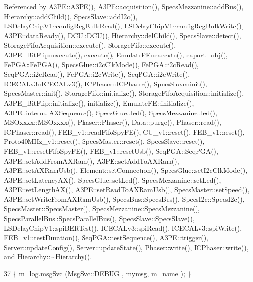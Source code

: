 Referenced by A3\+P\+E\+::\+A3\+P\+E(), A3\+P\+E\+::acquisition(), Specs\+Mezzanine\+::add\+Bus(), Hierarchy\+::add\+Child(), Specs\+Slave\+::add\+I2c(), L\+S\+Delay\+Chip\+V1\+::config\+Reg\+Bulk\+Read(), L\+S\+Delay\+Chip\+V1\+::config\+Reg\+Bulk\+Write(), A3\+P\+E\+::data\+Ready(), D\+C\+U\+::\+D\+C\+U(), Hierarchy\+::del\+Child(), Specs\+Slave\+::detect(), Storage\+Fifo\+Acquisition\+::execute(), Storage\+Fifo\+::execute(), A3\+P\+E\+\_\+\+Bit\+Flip\+::execute(), execute(), Emulate\+F\+E\+::execute(), export\+\_\+obj(), Fe\+P\+G\+A\+::\+Fe\+P\+G\+A(), Specs\+Glue\+::i2c\+Clk\+Mode(), Fe\+P\+G\+A\+::i2c\+Read(), Seq\+P\+G\+A\+::i2c\+Read(), Fe\+P\+G\+A\+::i2c\+Write(), Seq\+P\+G\+A\+::i2c\+Write(), I\+C\+E\+C\+A\+Lv3\+::\+I\+C\+E\+C\+A\+Lv3(), I\+C\+Phaser\+::\+I\+C\+Phaser(), Specs\+Slave\+::init(), Specs\+Master\+::init(), Storage\+Fifo\+::initialize(), Storage\+Fifo\+Acquisition\+::initialize(), A3\+P\+E\+\_\+\+Bit\+Flip\+::initialize(), initialize(), Emulate\+F\+E\+::initialize(), A3\+P\+E\+::internal\+A\+X\+Sequence(), Specs\+Glue\+::led(), Specs\+Mezzanine\+::led(), M\+S\+Oxxxx\+::\+M\+S\+Oxxxx(), Phaser\+::\+Phaser(), Data\+::purge(), Phaser\+::read(), I\+C\+Phaser\+::read(), F\+E\+B\+\_\+v1\+::read\+Fifo\+Spy\+F\+E(), C\+U\+\_\+v1\+::reset(), F\+E\+B\+\_\+v1\+::reset(), Proto40\+M\+Hz\+\_\+v1\+::reset(), Specs\+Master\+::reset(), Specs\+Slave\+::reset(), F\+E\+B\+\_\+v1\+::reset\+Fifo\+Spy\+F\+E(), F\+E\+B\+\_\+v1\+::reset\+Usb(), Seq\+P\+G\+A\+::\+Seq\+P\+G\+A(), A3\+P\+E\+::set\+Add\+From\+A\+X\+Ram(), A3\+P\+E\+::set\+Add\+To\+A\+X\+Ram(), A3\+P\+E\+::set\+A\+X\+Ram\+Usb(), Element\+::set\+Connection(), Specs\+Glue\+::set\+I2c\+Clk\+Mode(), A3\+P\+E\+::set\+Latency\+A\+X(), Specs\+Glue\+::set\+Led(), Specs\+Mezzanine\+::set\+Led(), A3\+P\+E\+::set\+Length\+A\+X(), A3\+P\+E\+::set\+Read\+To\+A\+X\+Ram\+Usb(), Specs\+Master\+::set\+Speed(), A3\+P\+E\+::set\+Write\+From\+A\+X\+Ram\+Usb(), Specs\+Bus\+::\+Specs\+Bus(), Specs\+I2c\+::\+Specs\+I2c(), Specs\+Master\+::\+Specs\+Master(), Specs\+Mezzanine\+::\+Specs\+Mezzanine(), Specs\+Parallel\+Bus\+::\+Specs\+Parallel\+Bus(), Specs\+Slave\+::\+Specs\+Slave(), L\+S\+Delay\+Chip\+V1\+::spi\+B\+E\+R\+Test(), I\+C\+E\+C\+A\+Lv3\+::spi\+Read(), I\+C\+E\+C\+A\+Lv3\+::spi\+Write(), F\+E\+B\+\_\+v1\+::test\+Duration(), Seq\+P\+G\+A\+::test\+Sequence(), A3\+P\+E\+::trigger(), Server\+::update\+Config(), Server\+::update\+State(), Phaser\+::write(), I\+C\+Phaser\+::write(), and Hierarchy\+::$\sim$\+Hierarchy().


\begin{DoxyCode}
37 \{ \hyperlink{classObject_a0d269813dd7ac1f24bc143031e2963f2}{m\_log}.\hyperlink{classMsgSvc_ad25f18047920cc59a314e5098259711c}{msgSvc} (\hyperlink{classMsgSvc_ae671eb7301996cd049d2da8a65925926a1dbdcc82dce88370ec335883c83b38b0}{MsgSvc::DEBUG}   , mymsg, \hyperlink{classObject_a8b83c95c705d2c3ba0d081fe1710f48d}{m\_name} ); \}
\end{DoxyCode}
\mbox{\label{classObject_a6c9a0397ca804e04d675ed05683f5420}} 
